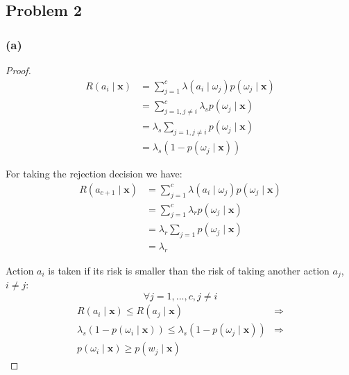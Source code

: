 \documentclass{article}
\begin{document}
\subsection*{Problem 2}
\subsubsection*{(a)}
\begin{proof}
    \begin{equation*}
    \begin{aligned}
        R(a_i \mid \boldsymbol x) &= \sum_{j = 1}^{c}\lambda(a_i \mid \omega_j)p(\omega_j \mid \boldsymbol x) \\
        &= \sum_{j=1, j \neq i}^{c}\lambda_s p(\omega_j \mid \boldsymbol x) \\
        &= \lambda_s \sum_{j = 1, j \neq i} p(\omega_j \mid \boldsymbol x) \\
        &= \lambda_s(1 - p(\omega_j \mid \boldsymbol x))
    \end{aligned}
    \end{equation*}

    For taking the rejection decision we have:
    \begin{equation*}
    \begin{aligned}
        R(a_{c + 1} \mid \boldsymbol x) &= \sum_{j = 1}^{c}\lambda(a_i \mid \omega_j)p(\omega_j \mid \boldsymbol x) \\
        &= \sum_{j=1}^{c}\lambda_r p(\omega_j \mid \boldsymbol x) \\
        &= \lambda_r \sum_{j = 1} p(\omega_j \mid \boldsymbol x) \\
        &= \lambda_r
    \end{aligned}
    \end{equation*}

    Action $a_i$ is taken if its risk is smaller than the risk of taking another action $a_j$, $i \neq j$:
    \[\forall j = 1, ..., c, j \neq i\]
    \begin{equation*}
    \begin{aligned}
        R(a_i \mid \boldsymbol x) \leq R(a_j \mid \boldsymbol x) &\Rightarrow \\
        \lambda_s(1 - p(\omega_i \mid \boldsymbol x)) \leq \lambda_s(1 - p(\omega_j \mid \boldsymbol x)) &\Rightarrow \\
        p(\omega_i \mid \boldsymbol x) \geq p(w_j \mid \boldsymbol x)
    \end{aligned}
    \end{equation*}


\end{proof}
\end{document}
